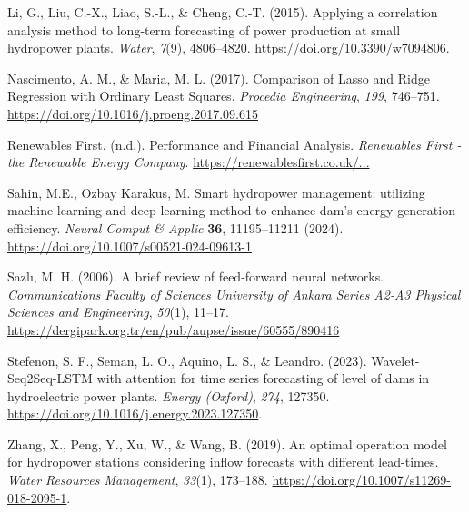 \documentclass[12pt]{article}
\begin{document}
\begin{thebibliography}{9}
Li, G., Liu, C.-X., Liao, S.-L., \& Cheng, C.-T. (2015). Applying a correlation analysis method to long-term forecasting of power production at small hydropower plants. \textit{Water}, \textit{7}(9), 4806--4820. \href{https://doi.org/10.3390/w7094806}{https://doi.org/10.3390/w7094806}.

Nascimento, A. M., & Maria, M. L. (2017). Comparison of Lasso and Ridge Regression with Ordinary Least Squares. \textit{Procedia Engineering}, \textit{199}, 746–751. \href{https://doi.org/10.1016/j.proeng.2017.09.615}{https://doi.org/10.1016/j.proeng.2017.09.615}

Renewables First. (n.d.). Performance and Financial Analysis. \textit{Renewables First - the Renewable Energy Company}. \url{https://renewablesfirst.co.uk/...}

Sahin, M.E., Ozbay Karakus, M. Smart hydropower management: utilizing machine learning and deep learning method to enhance dam's energy generation efficiency. \textit{Neural Comput \& Applic} \textbf{36}, 11195--11211 (2024). \href{https://doi.org/10.1007/s00521-024-09613-1}{https://doi.org/10.1007/s00521-024-09613-1}

Sazlı, M. H. (2006). A brief review of feed-forward neural networks. \textit{Communications Faculty of Sciences University of Ankara Series A2-A3 Physical Sciences and Engineering}, \textit{50}(1), 11–17.
\href{https://dergipark.org.tr/en/pub/aupse/issue/60555/890416}{https://dergipark.org.tr/en/pub/aupse/issue/60555/890416}

Stefenon, S. F., Seman, L. O., Aquino, L. S., \& Leandro. (2023). Wavelet-Seq2Seq-LSTM with attention for time series forecasting of level of dams in hydroelectric power plants. \textit{Energy (Oxford)}, \textit{274}, 127350. \href{https://doi.org/10.1016/j.energy.2023.127350}{https://doi.org/10.1016/j.energy.2023.127350}.

Zhang, X., Peng, Y., Xu, W., \& Wang, B. (2019). An optimal operation model for hydropower stations considering inflow forecasts with different lead-times. \textit{Water Resources Management}, \textit{33}(1), 173--188. \href{https://doi.org/10.1007/s11269-018-2095-1}{https://doi.org/10.1007/s11269-018-2095-1}.

\end{thebibliography}
\end{document}
